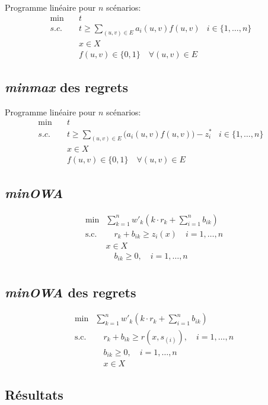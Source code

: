 \documentclass[10pt,a4paper]{report}
\begin{document}
Programme linéaire pour $n$ scénarios:
\begin{align*}
\min\quad   & t&&\\
s.c.\quad   &t\ge\sum_{(u,v)\in E} a_i(u,v)f(u,v)&i\in\{1,\ldots,n\}\\
                & x \in X\\
            &f(u,v)\in \{0,1\} \quad \forall (u,v) \in E&
\end{align*}
\subsection*{\textit{minmax} des regrets}
Programme linéaire pour $n$ scénarios:
\begin{align*}
\min\quad   & t&&\\
s.c.\quad   &t\ge\sum_{(u,v)\in E} \bigl(a_i(u,v)f(u,v)\bigl)-z_i^*&i\in\{1,\ldots,n\}\\
                & x \in X\\
            &f(u,v)\in \{0,1\} \quad \forall (u,v) \in E&
\end{align*}
\subsection*{\textit{minOWA}}
\begin{align*}
\min            &\sum_{k=1}^n w'_k \left( k \cdot r_k + \sum_{i=1}^n b_{ik} \right) \\
\text{s.c.}     & \quad r_k + b_{ik} \geq z_i(x) \quad i = 1,\ldots,n\\
                & x \in X\\
                & \quad b_{ik} \geq 0, \quad i = 1, \dots, n \\
\end{align*}
\subsection*{\textit{minOWA} des regrets}
\begin{align*}
\min &\sum_{k=1}^n w'_k \left( k \cdot r_k + \sum_{i=1}^n b_{ik} \right) \\
\text{s.c.} & \quad r_k + b_{ik} \geq r(x,s_{(i)}), \quad i = 1, \dots, n \\
& \quad b_{ik} \geq 0, \quad i = 1, \dots, n \\
& \quad x \in X
\end{align*}
\subsection*{Résultats}
\end{document}
